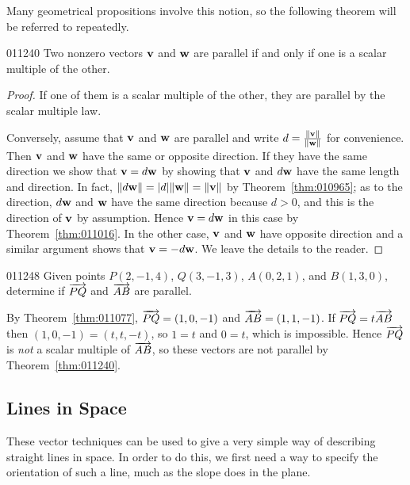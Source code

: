 Many geometrical propositions involve this notion, so the following theorem will be referred to repeatedly.


\begin{theorem}{}{011240}
Two nonzero vectors $\textbf{v}$ and $\textbf{w}$ are parallel if and only if one is a scalar multiple of the other.
\end{theorem}

\begin{proof}
If one of them is a scalar multiple of the other, they are parallel by the scalar multiple law.


Conversely, assume that $\textbf{v}$ and $\textbf{w}$ are parallel and write $d = \tfrac{\| \textbf{v} \|}{\| \textbf{w} \|}$
 for convenience. Then $\textbf{v}$ and $\textbf{w}$ have the same or opposite direction. If they have the same direction we show that $\textbf{v} = d\textbf{w}$ by showing that $\textbf{v}$ and $d\textbf{w}$ have the same length and direction. In fact, $\| d\textbf{w}\| = |d| \|\textbf{w}\| = \|\textbf{v}\|$ by Theorem~\ref{thm:010965}; as to the direction, $d\textbf{w}$ and $\textbf{w}$ have the same direction because $d > 0$, and this is the direction of $\textbf{v}$ by assumption. Hence $\textbf{v} = d\textbf{w}$ in this case by Theorem~\ref{thm:011016}. In the other case, $\textbf{v}$ and $\textbf{w}$ have opposite direction and a similar argument shows that $\textbf{v} = -d\textbf{w}$. We leave the details to the reader.
\end{proof}

\begin{example}{}{011248}
Given points $P(2, -1, 4)$, $Q(3, -1, 3)$, $A(0, 2, 1)$, and $B(1, 3, 0)$, determine if $\overrightarrow{PQ}$ and $\overrightarrow{AB}$ are parallel.

\begin{solution}
  By Theorem~\ref{thm:011077}, $\overrightarrow{PQ} = (1, 0, -1)$ and $\overrightarrow{AB} = (1, 1, -1)$. If $\overrightarrow{PQ} = t\overrightarrow{AB}$
 then $(1, 0, -1) = (t, t, -t)$, so $1 = t$ and $0 = t$, which is impossible. Hence $\overrightarrow{PQ}$ is \textit{not} a scalar multiple of $\overrightarrow{AB}$, so these vectors are not parallel by Theorem~\ref{thm:011240}.
\end{solution}
\end{example}

\vspace*{-1em}
\subsection*{Lines in Space}
These
 vector techniques can be used to give a very simple way of describing 
straight lines in space. In order to do this, we first need a way to 
specify the orientation of such a line, much as the slope does in the 
plane.


